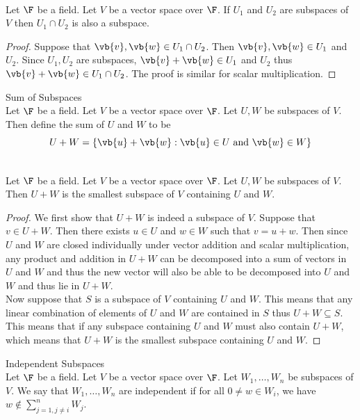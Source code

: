 \documentclass[a4paper]{article}
\begin{document}
\begin{prp}{}{}\\
Let $\F$ be a field. Let $V$ be a vector space over $\F$. If $U_1$ and $U_2$ are subspaces of $V$ then $U_1\cap U_2$ is also a subspace. 
\begin{proof} Suppose that $\vb{v},\vb{w}\in U_1\cap U_2$. Then $\vb{v},\vb{w}\in U_1$ and $U_2$. Since $U_1,U_2$ are subspaces, $\vb{v}+\vb{w}\in U_1$ and $U_2$ thus $\vb{v}+\vb{w}\in U_1\cap U_2$. The proof is similar for scalar multiplication. 
\end{proof}
\end{prp}

\begin{defn}{Sum of Subspaces}{}\\
Let $\F$ be a field. Let $V$ be a vector space over $\F$. Let $U,W$ be subspaces of $V$. Then define the sum of $U$ and $W$ to be $$U+W=\{\vb{u}+\vb{w}:\vb{u}\in U\text{ and }\vb{w}\in W\}$$
\end{defn}

\begin{prp}{}{}\\
Let $\F$ be a field. Let $V$ be a vector space over $\F$. Let $U,W$ be subspaces of $V$. Then $U+W$ is the smallest subspace of $V$ containing $U$ and $W$. 
\begin{proof}
We first show that $U+W$ is indeed a subspace of $V$. Suppose that $v\in U+W$. Then there exists $u\in U$ and $w\in W$ such that $v=u+w$. Then since $U$ and $W$ are closed individually under vector addition and scalar multiplication, any product and addition in $U+W$ can be decomposed into a sum of vectors in $U$ and $W$ and thus the new vector will also be able to be decomposed into $U$ and $W$ and thus lie in $U+W$. \\

Now suppose that $S$ is a subspace of $V$ containing $U$ and $W$. This means that any linear combination of elements of $U$ and $W$ are contained in $S$ thus $U+W\subseteq S$. This means that if any subspace containing $U$ and $W$ must also contain $U+W$, which means that $U+W$ is the smallest subspace containing $U$ and $W$. 
\end{proof}
\end{prp}

\begin{defn}{Independent Subspaces}{}\\
Let $\F$ be a field. Let $V$ be a vector space over $\F$. Let $W_1,\dots,W_n$ be subspaces of $V$. We say that $W_1,\dots,W_n$ are independent if for all $0\neq w\in W_i$, we have $w\notin\sum_{j=1,j\neq i}^nW_j$. 
\end{defn}
\end{document}

